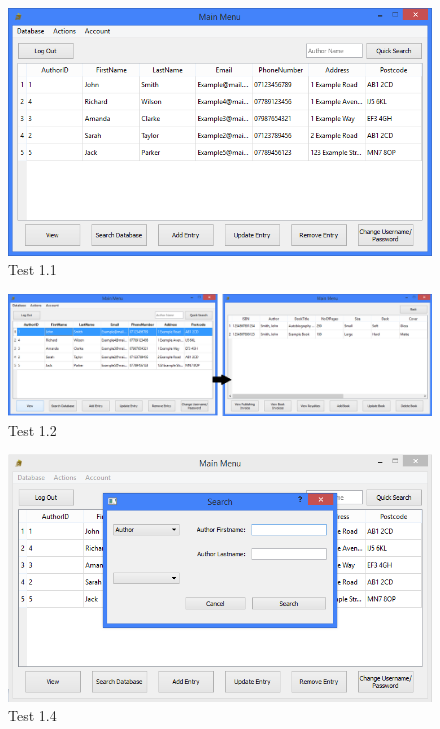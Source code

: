 \begin{landscape}
\begin{figure}[H]
    \includegraphics[width=\textwidth]{./Testing/Evidence/LoginTestSucceed2.png}
    \caption{Test 1.1}  \label{fig:LoginTestSucceed2}
\end{figure}

\begin{figure}[H]
    \includegraphics[width=\textwidth]{./Testing/Evidence/ViewButtonTest.png}
    \caption{Test 1.2}  \label{fig:ViewButtonTest}
\end{figure}

\begin{figure}[H]
    \includegraphics[width=\textwidth]{./Testing/Evidence/SearchDatabaseButtonTest.png}
    \caption{Test 1.4}  \label{fig:SearchDatabaseButtonTest}
\end{figure}


\end{landscape}

